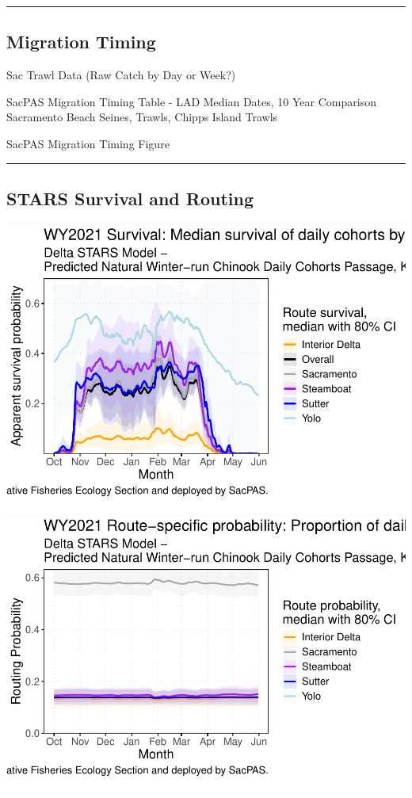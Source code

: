 \documentclass[
]{book}
\theoremstyle{definition}
\theoremstyle{definition}
\theoremstyle{definition}
\theoremstyle{definition}
\theoremstyle{remark}
\begin{document}
\begin{center}\rule{0.5\linewidth}{0.5pt}\end{center}

\hypertarget{migration-timing-2}{%
\subsection{Migration Timing}\label{migration-timing-2}}

Sac Trawl Data (Raw Catch by Day or Week?)

SacPAS Migration Timing Table - LAD Median Dates, 10 Year Comparison Sacramento Beach Seines, Trawls, Chipps Island Trawls

SacPAS Migration Timing Figure

\begin{center}\rule{0.5\linewidth}{0.5pt}\end{center}

\hypertarget{stars-survival-and-routing}{%
\subsection{STARS Survival and Routing}\label{stars-survival-and-routing}}

\includegraphics{_main_files/figure-latex/survival-fig-1.pdf}

\includegraphics{_main_files/figure-latex/routing-fig-1.pdf}
\end{document}
